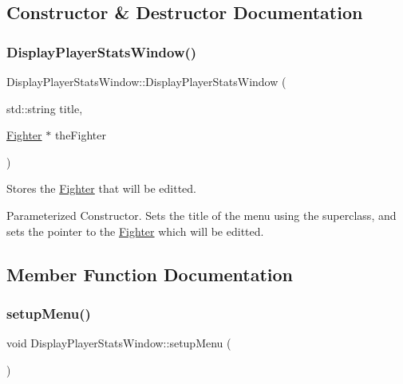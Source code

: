 \subsection{Constructor \& Destructor Documentation}
\hypertarget{class_display_player_stats_window_aea83c9776d9fe14ef35351765f333b74}{}\label{class_display_player_stats_window_aea83c9776d9fe14ef35351765f333b74} 
\subsubsection{\texorpdfstring{Display\+Player\+Stats\+Window()}{DisplayPlayerStatsWindow()}}
{\footnotesize\ttfamily Display\+Player\+Stats\+Window\+::\+Display\+Player\+Stats\+Window (\begin{DoxyParamCaption}\item[{std\+::string}]{title,  }\item[{\hyperlink{class_fighter}{Fighter} $\ast$}]{the\+Fighter }\end{DoxyParamCaption})}



Stores the \hyperlink{class_fighter}{Fighter} that will be editted. 

Parameterized Constructor. Sets the title of the menu using the superclass, and sets the pointer to the \hyperlink{class_fighter}{Fighter} which will be editted. 

\subsection{Member Function Documentation}
\hypertarget{class_display_player_stats_window_afacc32b87a4cb61bf971db00fb877cf3}{}\label{class_display_player_stats_window_afacc32b87a4cb61bf971db00fb877cf3} 
\subsubsection{\texorpdfstring{setup\+Menu()}{setupMenu()}}
{\footnotesize\ttfamily void Display\+Player\+Stats\+Window\+::setup\+Menu (\begin{DoxyParamCaption}{ }\end{DoxyParamCaption})\hspace{0.3cm}{\ttfamily [virtual]}}


